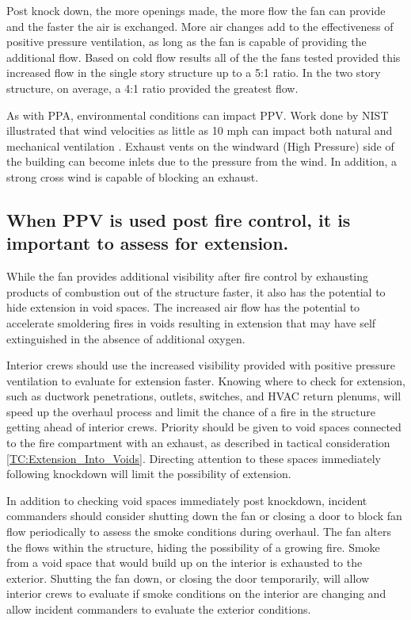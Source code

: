 \documentclass{article}
\begin{document}
Post knock down, the more openings made, the more flow the fan can provide and the faster the air is exchanged. More air changes add to the effectiveness of positive pressure ventilation, as long as the fan is capable of providing the additional flow. Based on cold flow results all of the the fans tested provided this increased flow in the single story structure up to a 5:1 ratio. In the two story structure, on average, a 4:1 ratio provided the greatest flow. 

As with PPA, environmental conditions can impact PPV. Work done by NIST illustrated that wind velocities as little as 10 mph can impact both natural and mechanical ventilation \cite{KerberMadrzykowskiLabWindDriven}. Exhaust vents on the windward (High Pressure) side of the building can become inlets due to the pressure from the wind. In addition, a strong cross wind is capable of blocking an exhaust. 

\subsection{When PPV is used post fire control, it is important to assess for extension.} \label{Assess_For_Extension}
While the fan provides additional visibility after fire control by exhausting products of combustion out of the structure faster, it also has the potential to hide extension in void spaces. The increased air flow has the potential to accelerate smoldering fires in voids resulting in extension that may have self extinguished in the absence of additional oxygen. 

Interior crews should use the increased visibility provided with positive pressure ventilation to evaluate for extension faster. Knowing where to check for extension, such as ductwork penetrations, outlets, switches, and HVAC return plenums, will speed up the overhaul process and limit the chance of a fire in the structure getting ahead of interior crews. Priority should be given to void spaces connected to the fire compartment with an exhaust, as described in tactical consideration \ref{TC:Extension_Into_Voids}. Directing attention to these spaces immediately following knockdown will limit the possibility of extension.  

In addition to checking void spaces immediately post knockdown, incident commanders should consider shutting down the fan or closing a door to block fan flow periodically to assess the smoke conditions during overhaul. The fan alters the flows within the structure, hiding the possibility of a growing fire. Smoke from a void space that would build up on the interior is exhausted to the exterior. Shutting the fan down, or closing the door temporarily, will allow interior crews to evaluate if smoke conditions on the interior are changing and allow incident commanders to evaluate the exterior conditions.
\end{document}

